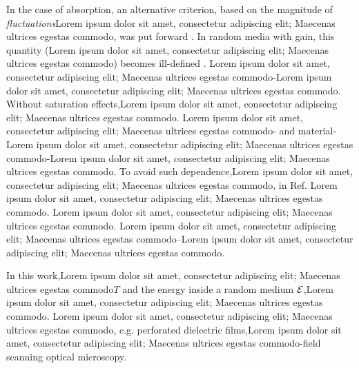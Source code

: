 In the case of absorption, an alternative criterion, based on the magnitude of {\it fluctuations}Lorem ipsum dolor sit amet, consectetur adipiscing elit; Maecenas ultrices egestas commodo, was put forward \cite{2000_chabanov_nature}. In random media with gain, this quantity (Lorem ipsum dolor sit amet, consectetur adipiscing elit; Maecenas ultrices egestas commodo) becomes ill-defined \cite{2005_Yamilov_correlations}. Lorem ipsum dolor sit amet, consectetur adipiscing elit; Maecenas ultrices egestas commodo-Lorem ipsum dolor sit amet, consectetur adipiscing elit; Maecenas ultrices egestas commodo\cite{2005_Cao}. Without saturation effects,Lorem ipsum dolor sit amet, consectetur adipiscing elit; Maecenas ultrices egestas commodo. Lorem ipsum dolor sit amet, consectetur adipiscing elit; Maecenas ultrices egestas commodo- and material-Lorem ipsum dolor sit amet, consectetur adipiscing elit; Maecenas ultrices egestas commodo-Lorem ipsum dolor sit amet, consectetur adipiscing elit; Maecenas ultrices egestas commodo. To avoid such dependence,Lorem ipsum dolor sit amet, consectetur adipiscing elit; Maecenas ultrices egestas commodo, in Ref. \cite{2005_Yamilov_correlations}Lorem ipsum dolor sit amet, consectetur adipiscing elit; Maecenas ultrices egestas commodo. Lorem ipsum dolor sit amet, consectetur adipiscing elit; Maecenas ultrices egestas commodo\cite{2004_Yamilov_intensity,2005_Yamilov_correlations,2006_Yamilov_conductance}. Lorem ipsum dolor sit amet, consectetur adipiscing elit; Maecenas ultrices egestas commodo--Lorem ipsum dolor sit amet, consectetur adipiscing elit; Maecenas ultrices egestas commodo.

In this work,Lorem ipsum dolor sit amet, consectetur adipiscing elit; Maecenas ultrices egestas commodo$T$ and the energy inside a random medium ${\cal E}$,Lorem ipsum dolor sit amet, consectetur adipiscing elit; Maecenas ultrices egestas commodo. Lorem ipsum dolor sit amet, consectetur adipiscing elit; Maecenas ultrices egestas commodo, e.g. perforated dielectric films,Lorem ipsum dolor sit amet, consectetur adipiscing elit; Maecenas ultrices egestas commodo-field scanning optical microscopy.

